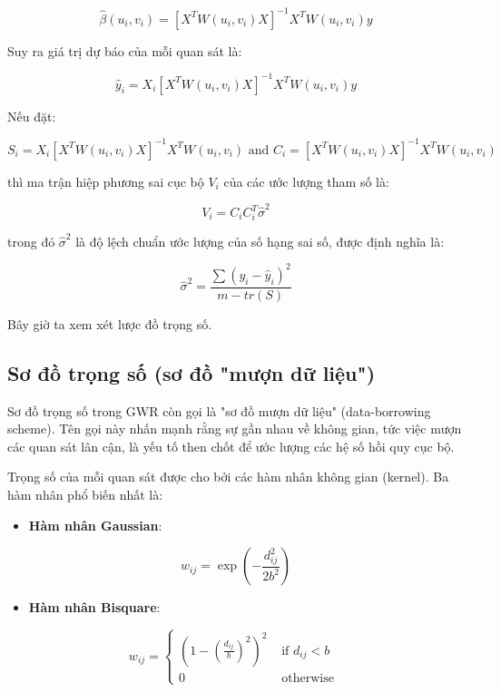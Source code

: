 \[
\hat \beta(u_{i}, v_{i}) = [X^{T} W(u_{i}, v_{i}) X]^{-1} X^{T} W(u_{i}, v_{i}) y
\]

Suy ra giá trị dự báo của mỗi quan sát là:

\[
\hat y_{i} = X_{i} [X^{T} W(u_{i}, v_{i}) X]^{-1} X^{T} W(u_{i}, v_{i}) y
\]

Nếu đặt:

\[
S_{i} = X_{i} [X^{T} W(u_{i}, v_{i}) X]^{-1} X^{T} W(u_{i}, v_{i}) \text{ and } C_{i} = [X^{T} W(u_{i}, v_{i}) X]^{-1} X^{T} W(u_{i}, v_{i})
\]

thì ma trận hiệp phương sai cục bộ \(V_{i}\) của các ước lượng tham số là:

\[
V_{i} = C_{i} C^{T}_{i} \hat \sigma^{2}
\]

trong đó \(\hat \sigma^{2}\) là độ lệch chuẩn ước lượng của số hạng sai số, được định nghĩa là:

\[
\hat \sigma^{2} = \frac{\sum (y_{i} - \hat y_{i})^{2}}{m - tr(S)}
\]

Bây giờ ta xem xét lược đồ trọng số.

\subsection{Sơ đồ trọng số (sơ đồ "mượn dữ liệu")}

Sơ đồ trọng số trong GWR còn gọi là "sơ đồ mượn dữ liệu" (data-borrowing scheme). Tên gọi này nhấn mạnh rằng sự gần nhau về không gian, tức việc mượn các quan sát lân cận, là yếu tố then chốt để ước lượng các hệ số hồi quy cục bộ.

Trọng số của mỗi quan sát được cho bởi các hàm nhân không gian (kernel). Ba hàm nhân phổ biến nhất là:

\begin{itemize}
\item
  \textbf{Hàm nhân Gaussian}:
\end{itemize}

\[
w_{ij} = \exp \left ( -\frac{d^{2}_{ij}}{2b^{2}} \right )
\]

\begin{itemize}
\item
  \textbf{Hàm nhân Bisquare}:
\end{itemize}

\[
w_{ij} = \begin{cases}
     \left ( 1 - \left ( \frac{d_{ij}}{b} \right )^{2} \right )^2 & \text{ if } d_{ij} < b \\
     0 & \text{ otherwise }
\end{cases}
\]

